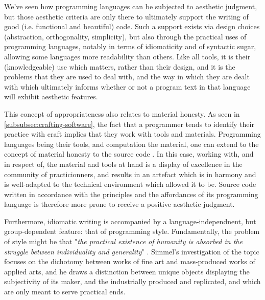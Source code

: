We've seen how programming languages can be subjected to aesthetic judgment, but those aesthetic criteria are only there to ultimately support the writing of good (i.e. functional and beautiful) code. Such a support exists via design choices (abstraction, orthogonality, simplicity), but also through the practical uses of programming languages, notably in terms of idiomaticity and of syntactic sugar, allowing some languages more readability than others. Like all tools, it is their (knowledgeable) use which matters, rather than their design, and it is the problems that they are used to deal with, and the way in which they are dealt with which ultimately informs whether or not a program text in that language will exhibit aesthetic features.

This concept of appropriateness also relates to material honesty. As seen in \ref{subsubsec:crafting-software}, the fact that a programmer tends to identify their practice with craft implies that they work with tools and materials. Programming languages being their tools, and computation the material, one can extend to the concept of material honesty to the source code \citep{sennett_craftsman_2009}. In this case, working with, and in respect of, the material and tools at hand is a display of excellence in the community of practicionners, and results in an artefact which is in harmony and is well-adapted to the technical environment which allowed it to be. Source code written in accordance with the principles and the affordances of its programming language is therefore more prone to receive a positive aesthetic judgment.

Furthermore, idiomatic writing is accompanied by a language-independnent, but group-dependent feature: that of programming style. Fundamentally, the problem of style might be that "\emph{the practical existence of humanity is absorbed in the struggle between individuality and generality}" \citep{simmel_problem_1991}. Simmel's investigation of the topic focuses on the dichotomy between works of fine art and mass-produced works of applied arts, and he draws a distinction between unique objects displaying the subjectivity of its maker, and  the industrially produced and replicated, and which are only meant to serve practical ends.

